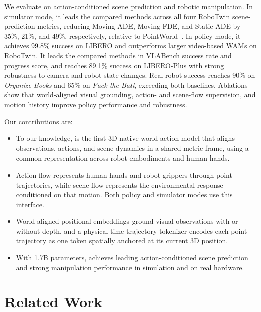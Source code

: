 We evaluate \method{} on action-conditioned scene prediction and
robotic manipulation.
In simulator mode, it leads the compared methods across all four
RoboTwin scene-prediction metrics, reducing Moving ADE, Moving FDE,
and Static ADE by 35\%, 21\%, and 49\%, respectively, relative to
PointWorld~\citep{huang2026pointworld}.
In policy mode, it achieves 99.8\% success on LIBERO and outperforms
larger video-based WAMs on RoboTwin.
It leads the compared methods in VLABench success rate and progress
score, and reaches 89.1\% success on LIBERO-Plus with strong robustness
to camera and robot-state changes.
Real-robot success reaches 90\% on \emph{Organize Books} and 65\% on
\emph{Pack the Ball}, exceeding both baselines.
Ablations show that world-aligned visual grounding, action- and scene-flow
supervision, and motion history improve policy performance and robustness.

Our contributions are:\nopagebreak[4]
\begin{itemize}
    \item To our knowledge, \method{} is the first 3D-native world action
    model that aligns observations, actions, and scene dynamics in a
    shared metric frame, using a common representation across robot
    embodiments and human hands.

    \item Action flow represents human hands and robot grippers through
    point trajectories, while scene flow represents the environmental
    response conditioned on that motion. Both policy and simulator modes
    use this interface.

    \item World-aligned positional embeddings ground visual observations
    with or without depth, and a physical-time trajectory tokenizer
    encodes each point trajectory as one token spatially anchored at its
    current 3D position.

    \item With 1.7B parameters, \method{} achieves leading action-conditioned
    scene prediction and strong manipulation performance in simulation
    and on real hardware.
\end{itemize}

\vspace{-0.3cm}

\section{Related Work}
\label{sec:related_work}
\vspace{-0.2cm}

